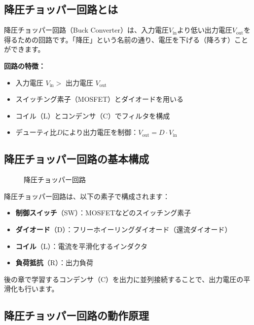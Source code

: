 \subsection{降圧チョッパー回路とは}

降圧チョッパー回路（Buck Converter）は、入力電圧$V_{\text{in}}$より低い出力電圧$V_{\text{out}}$を得るための回路です。「降圧」という名前の通り、電圧を下げる（降ろす）ことができます。

\textbf{回路の特徴：}

\begin{itemize}
\item 入力電圧 $V_{\text{in}} > $ 出力電圧 $V_{\text{out}}$
\item スイッチング素子（MOSFET）とダイオードを用いる
\item コイル（L）とコンデンサ（C）でフィルタを構成
\item デューティ比$D$により出力電圧を制御：$V_{\text{out}} = D \cdot V_{\text{in}}$
\end{itemize}

\subsection{降圧チョッパー回路の基本構成}

\begin{figure}[H]
\centering
{}
\caption{降圧チョッパー回路}
\label{fig:ch05_buck_converter}
\end{figure}

降圧チョッパー回路は、以下の素子で構成されます：

\begin{itemize}
\item \textbf{制御スイッチ}（SW）：MOSFETなどのスイッチング素子
\item \textbf{ダイオード}（D）：フリーホイーリングダイオード（還流ダイオード）
\item \textbf{コイル}（L）：電流を平滑化するインダクタ
\item \textbf{負荷抵抗}（R）：出力負荷
\end{itemize}

後の章で学習するコンデンサ（C）を出力に並列接続することで、出力電圧の平滑化も行います。

\subsection{降圧チョッパー回路の動作原理}


